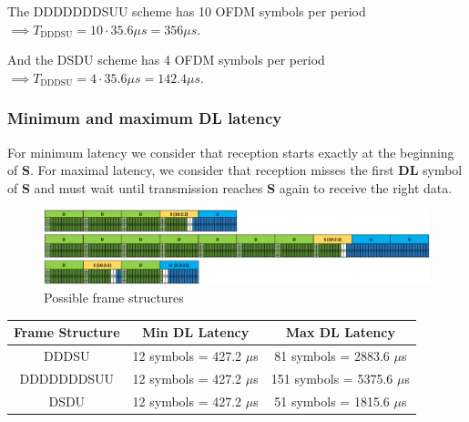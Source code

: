 \documentclass[]{article}
\begin{document}
	The DDDDDDDSUU scheme has 10 OFDM symbols per period $\implies T_{\text{DDDSU}} = 10 \cdot 35.6 \mu s = 356 \mu s$.
	
	And the DSDU scheme has 4 OFDM symbols per period $\implies T_{\text{DDDSU}} = 4 \cdot 35.6 \mu s = 142.4 \mu s$.
	
	\subsubsection*{Minimum and maximum DL latency}
	
	For minimum latency we consider that reception starts exactly at the beginning of \textbf{S}. For maximal latency, we consider that reception misses the first \textbf{DL} symbol of \textbf{S} and must wait until transmission reaches \textbf{S} again to receive the right data.
	
	\begin{figure}[h!]
		\centering
		\includegraphics[scale=0.7]{5GframeSchemesQuestion9.PNG}
		\caption{Possible frame structures}
	\end{figure}
	
	\begin{table}[h]
		\centering
		\begin{tabular}{|c|c|c|}
			\hline
			\textbf{Frame Structure} & \textbf{Min DL Latency} & \textbf{Max DL Latency} \\
			\hline
			DDDSU & 12 symbols = 427.2 $\mu$s & 81 symbols = 2883.6 $\mu$s \\
			\hline
			DDDDDDDSUU & 12 symbols = 427.2 $\mu$s & 151 symbols = 5375.6 $\mu$s \\
			\hline
			DSDU & 12 symbols = 427.2 $\mu$s & 51 symbols = 1815.6 $\mu$s \\
			\hline
		\end{tabular}
	\end{table}
	
\end{document}
